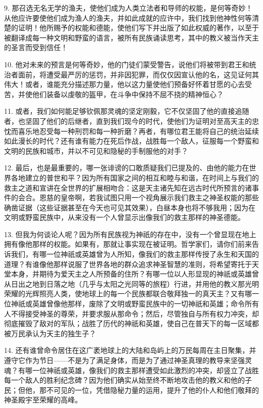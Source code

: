 9. 那召选无名无学的渔夫，使他们成为人类立法者和导师的权能，是何等奇妙！从他应许要使他们成为渔人的渔夫，并如此成就的应许中，我们找到他神性何等清楚的证明！他所赐予的权能和德能，使他们写下并出版了如此权威的著作，以至于被翻译成每一种文明和野蛮的语言，被所有民族诵读思考，其中的教义被当作天主的圣言而受到信任！\par

10. 他对未来的预言是何等奇妙，他的门徒们蒙受警告，说他们将被带到君王和统治者面前，将遭受最严厉的惩罚，并非因犯罪，而仅仅因宣认他的名，这见证何其伟大！或者，谁能充分描述那力量，他以这力量使他们预备好怀着甘愿的心去受苦，并使他们装备以虔敬的盔甲，在斗争中保持不屈不挠的精神恒心？\par

11. 或者，我们如何能足够钦佩那灵魂的坚定刚毅，它不仅坚固了他的直接追随者，也坚固了他们的后继者，直到我们现今的时代，使他们为证明对至高天主的忠忱而喜乐地忍受每一种刑罚和每一种折磨？再者，有哪位君王能将自己的统治延续如此漫长的时代？还有谁有能力在死后作战，战胜每一个敌人，征服每一个野蛮和文明的民族和城市，并以不可见和隐秘的手制服他的对手？\par

12. 最后，也是最重要的，哪一张诽谤的口敢质疑我们已提及的、由他的能力在世界各地建立的普世和平？因为所有国家之间的相互和睦与和谐，在时间上与我们的救主之道和宣讲在全世界的扩展相吻合：这是天主诸先知在远古时代所预言的诸事件的会合。恩慈的皇帝啊，若我试图只用一个视角展示我们救主之神圣权能的那些确凿证据（这些证据甚至在今天也可见其效果），白昼本身也将不够我用；因为在文明或野蛮民族中，从来没有一个人曾显示出像我们的救主那样的神圣德能。\par

13. 但我为何谈论人呢？因为所有民族视为神祇的存在中，没有一个曾显现在地上拥有像他那样的权能。如果有，那就让事实现在被证明。哲学家们，请你们前来告诉我们，有哪一位神祇或英雄曾为人所知，像我们的救主那样传授了永生和天国的道理？有谁像他那样说服了世界各地的群众追求神圣智慧的准则，将希望寄托于天堂本身，并期待为爱天主之人所预备的住所？有哪一位以人形显现的神祇或英雄曾从日出之地到日落之地（几乎与太阳之光同等的旅程）行进，并用他的教义那光明荣耀的光辉照亮人类，使地球上的每一个民族都联合敬拜独一的真天主？又有哪一位神祇或英雄曾像他那样，废除了文明或野蛮民族中的一切神祇和英雄；命令所有人不得接受神圣的尊荣，并要求服从那命令；然后，尽管独自与所有权力冲突，却彻底摧毁了敌对的军队；战胜了历代的神祇和英雄，使自己在普天下的每一区域都被万民承认为天主的独生子？\par

14. 还有谁曾命令居住在这广袤地球上的大陆和岛屿上的万民每周在主日聚集，并遵守它作为节日——不是为了满足身体，而是为了通过神圣真理的教导来坚强灵魂？有哪一位神祇或英雄，像我们的救主那样遭受如此激烈的冲突，却竖立了战胜每一个敌人的胜利纪念碑？因为他们确实从始至终不断地攻击他的教义和他的子民；但他，那不可见的一位，凭借隐秘力量的运用，提升了他的仆人和他们敬拜的神圣殿宇至荣耀的高峰。\par

